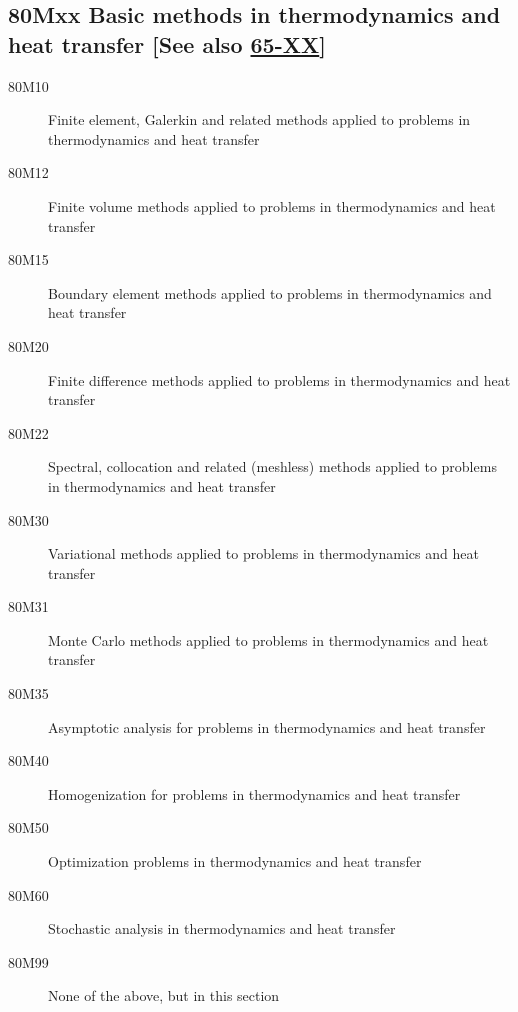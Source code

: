 \documentclass[letterpaper]{article}
\begin{document}
\subsection*{80Mxx  Basic methods in thermodynamics and heat transfer [See also \hyperref[65-XX]{65-XX}] }\label{80Mxx}
\begin{description}  
\item [80M10]\label{80M10} Finite element, Galerkin and related methods applied to problems in thermodynamics and heat transfer
\item [80M12]\label{80M12} Finite volume methods applied to problems in thermodynamics and heat transfer
\item [80M15]\label{80M15} Boundary element methods applied to problems in thermodynamics and heat transfer
\item [80M20]\label{80M20} Finite difference methods applied to problems in thermodynamics and heat transfer
\item [80M22]\label{80M22} Spectral, collocation and related (meshless) methods applied to problems in thermodynamics and heat transfer
\item [80M30]\label{80M30} Variational methods applied to problems in thermodynamics and heat transfer
\item [80M31]\label{80M31} Monte Carlo methods applied to problems in thermodynamics and heat transfer
\item [80M35]\label{80M35} Asymptotic analysis for problems in thermodynamics and heat transfer
\item [80M40]\label{80M40} Homogenization for problems in thermodynamics and heat transfer
\item [80M50]\label{80M50} Optimization problems in thermodynamics and heat transfer
\item [80M60]\label{80M60} Stochastic analysis in thermodynamics and heat transfer
\item [80M99]\label{80M99} None of the above, but in this section
\end{description}
\end{document}
